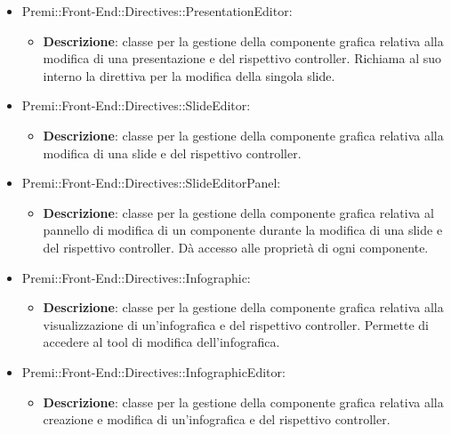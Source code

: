 \begin{itemize}
    \item Premi::Front-End::Directives::PresentationEditor:
	\begin{itemize}
		\item \textbf{Descrizione}: classe per la gestione della componente grafica relativa alla modifica di una presentazione e del rispettivo controller. Richiama al suo interno la direttiva per la modifica della singola slide.
	\end{itemize}

    \item Premi::Front-End::Directives::SlideEditor:
	\begin{itemize}
		\item \textbf{Descrizione}: classe per la gestione della componente grafica relativa alla modifica di una slide e del rispettivo controller.
	\end{itemize}

    \item Premi::Front-End::Directives::SlideEditorPanel:
	\begin{itemize}
		\item \textbf{Descrizione}: classe per la gestione della componente grafica relativa al pannello di modifica di un componente durante la modifica di una slide e del rispettivo controller. Dà accesso alle proprietà di ogni componente.
	\end{itemize}

    \item Premi::Front-End::Directives::Infographic:
	\begin{itemize}
		\item \textbf{Descrizione}: classe per la gestione della componente grafica relativa alla visualizzazione di un'\gls{infografica} e del rispettivo controller. Permette di accedere al tool di modifica dell'\gls{infografica}.
	\end{itemize}

    \item Premi::Front-End::Directives::InfographicEditor:
	\begin{itemize}
		\item \textbf{Descrizione}: classe per la gestione della componente grafica relativa alla creazione e modifica di un'\gls{infografica} e del rispettivo controller.
	\end{itemize}

\end{itemize}
